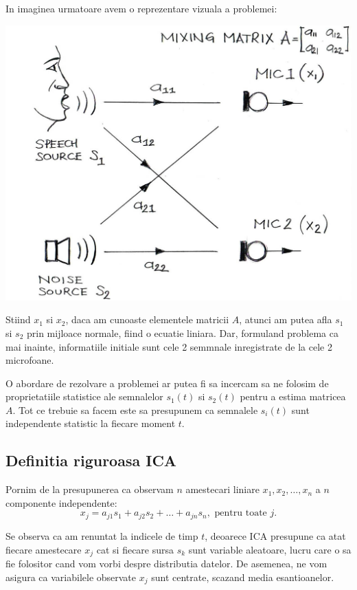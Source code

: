 \documentclass[12pt]{article}
\begin{document}
In imaginea urmatoare avem o reprezentare vizuala a problemei:

\includegraphics[scale=0.4]{two-sound-sources}


Stiind $x_1$ si $x_2$, daca am cunoaste elementele matricii $A$, atunci am putea afla $s_1$ si $s_2$ prin mijloace normale, fiind o ecuatie liniara. Dar, formuland problema ca mai inainte, informatiile initiale sunt cele 2 semmnale inregistrate de la cele 2 microfoane.

O abordare de rezolvare a problemei ar putea fi sa incercam sa ne folosim de proprietatiile statistice ale semnalelor $s_1(t)$ si $s_2(t)$ pentru a estima matricea $A$. Tot ce trebuie sa facem este sa presupunem ca semnalele $s_i(t)$ sunt independente statistic la fiecare moment $t$.
\newpage

\subsection{Definitia riguroasa ICA}
Pornim de la presupunerea ca observam $n$ amestecari liniare $x_1, x_2, \ldots, x_n$ a $n$ componente independente:
	\begin{equation}
		x_j=a_{j1}s_1+a_{j2}s_2+\ldots+a_{jn}s_n, \text{ pentru toate }j.
	\end{equation}

Se observa ca am renuntat la indicele de timp $t$, deoarece ICA presupune ca atat fiecare amestecare $x_j$ cat si fiecare sursa $s_k$ sunt variable aleatoare, lucru care o sa fie folositor cand vom vorbi despre distributia datelor. De asemenea, ne vom asigura ca variabilele observate $x_j$ sunt centrate, scazand media esantioanelor.
\end{document}
